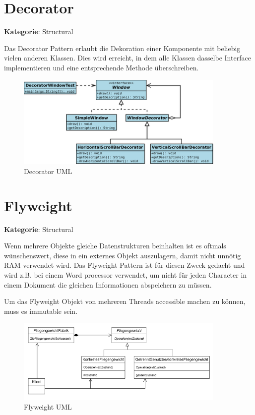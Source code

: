 \section{Decorator}
\textbf{Kategorie}: Structural

Das Decorator Pattern erlaubt die Dekoration einer Komponente mit beliebig vielen anderen Klassen. Dies wird erreicht, in dem alle Klassen dasselbe Interface implementieren und eine entsprechende Methode überschreiben.

\begin{figure}[H]
	\centering
	\includegraphics[width=0.9\textwidth]{content/gof/images/08-decorator-example-uml.png}
	\caption{Decorator UML}
\end{figure}


\section{Flyweight}
\textbf{Kategorie}: Structural

Wenn mehrere Objekte gleiche Datenstrukturen beinhalten ist es oftmals wünschenswert, diese in ein externes Objekt auszulagern, damit nicht unnötig RAM verwendet wird. Das Flyweight Pattern ist für diesen Zweck gedacht und wird z.B. bei einem Word processor verwendet, um nicht für jeden Character in einem Dokument die gleichen Informationen abspeichern zu müssen.

Um das Flyweight Objekt von mehreren Threads accessible machen zu können, muss es immutable sein.

\begin{figure}[H]
	\centering
	\includegraphics[width=0.9\textwidth]{content/gof/images/09-flyweight-uml.png}
	\caption{Flyweight UML}
\end{figure}

